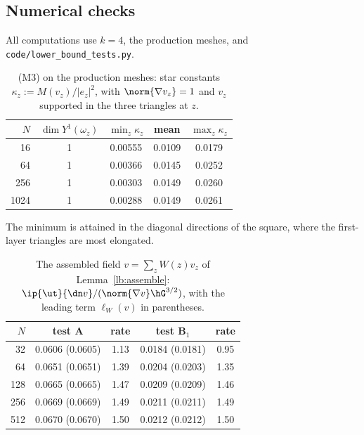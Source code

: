 \subsection{Numerical checks}\label{lb:sec:num}
All computations use $k=4$, the production meshes, and \texttt{code/lower\_bound\_tests.py}.

\begin{table}[h]
\centering
\caption{(M3) on the production meshes: star constants $\kappa_z:=M(v_z)/|e_z|^2$, with $\norm{\nabla v_z}=1$ and $v_z$ supported in the three triangles at $z$.}\label{lb:tab:stars}
\begin{tabular}{rcccc}
\toprule
$N$ & $\dim Y^1(\omega_z)$ & $\min_z\kappa_z$ & mean & $\max_z\kappa_z$\\
\midrule
16 & 1 & 0.00555 & 0.0109 & 0.0179\\
64 & 1 & 0.00366 & 0.0145 & 0.0252\\
256 & 1 & 0.00303 & 0.0149 & 0.0260\\
1024 & 1 & 0.00288 & 0.0149 & 0.0261\\
\bottomrule
\end{tabular}
\end{table}
The minimum is attained in the diagonal directions of the square, where the first-layer triangles are most elongated.

\begin{table}[h]
\centering
\caption{The assembled field $v=\sum_zW(z)v_z$ of Lemma~\ref{lb:assemble}: $\ip{\ut}{\dn v}/(\norm{\nabla v}\hG^{3/2})$, with the leading term $\ell_W(v)$ in parentheses.}\label{lb:tab:field}
\begin{tabular}{rcccc}
\toprule
$N$ & test A & rate & test B$_1$ & rate\\
\midrule
32 & 0.0606 (0.0605) & 1.13 & 0.0184 (0.0181) & 0.95\\
64 & 0.0651 (0.0651) & 1.39 & 0.0204 (0.0203) & 1.35\\
128 & 0.0665 (0.0665) & 1.47 & 0.0209 (0.0209) & 1.46\\
256 & 0.0669 (0.0669) & 1.49 & 0.0211 (0.0211) & 1.49\\
512 & 0.0670 (0.0670) & 1.50 & 0.0212 (0.0212) & 1.50\\
\bottomrule
\end{tabular}
\end{table}

